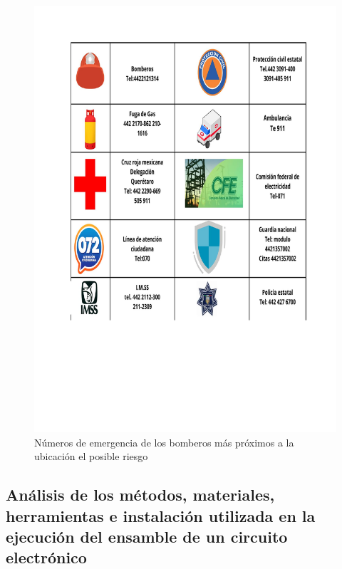     \begin{figure}[H]
        \centering
        \includegraphics[scale=0.45]{9/Img/numeroEmergencia.pdf}
        \caption{Números de emergencia de los bomberos más próximos a la ubicación el posible riesgo}
    \end{figure}
    \subsection{Análisis de los métodos, materiales, herramientas e instalación utilizada en la ejecución del ensamble de un circuito electrónico}
    
